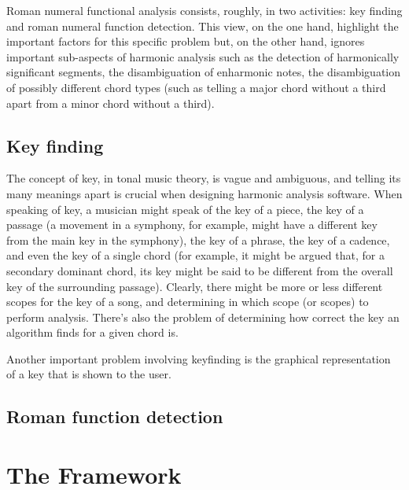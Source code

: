 Roman numeral functional analysis consists, roughly, in two
activities: key finding and roman numeral function detection. This
view, on the one hand, highlight the important factors for this
specific problem but, on the other hand, ignores important sub-aspects
of harmonic analysis such as the detection of harmonically significant
segments, the disambiguation of enharmonic notes, the disambiguation
of possibly different chord types (such as telling a major chord
without a third apart from a minor chord without a third).

\subsection{Key finding}
\label{sec:key-finding}


The concept of key, in tonal music theory, is vague and ambiguous, and
telling its many meanings apart is crucial when designing harmonic
analysis software. When speaking of key, a musician might speak of the
key of a piece, the key of a passage (a movement in a symphony, for
example, might have a different key from the main key in the
symphony), the key of a phrase, the key of a cadence, and even the key
of a single chord (for example, it might be argued that, for a
secondary dominant chord, its key might be said to be different from
the overall key of the surrounding passage). Clearly, there might be
more or less different scopes for the key of a song, and determining
in which scope (or scopes) to perform analysis. There's also the
problem of determining how correct the key an algorithm finds for a
given chord is.


Another important problem involving keyfinding is the graphical
representation of a key that is shown to the user.

\subsection{Roman function detection}
\label{sec:roman-funct-detect}



\section{The Framework}
\label{sec:framework}


